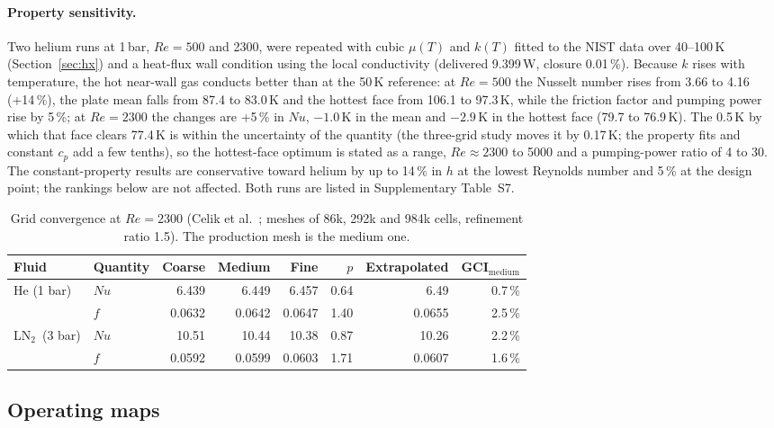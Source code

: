 \documentclass[preprint,12pt]{elsarticle}
\newcommand{\LNtwo}{LN$_2$}
\renewcommand{\Re}{\mathit{Re}}
\newcommand{\Nu}{\mathit{Nu}}
\begin{document}
\paragraph{Property sensitivity.} Two helium runs at 1\,bar, $\Re=500$ and 2300, were repeated
with cubic $\mu(T)$ and $k(T)$ fitted to the NIST data over 40--100\,K (Section~\ref{sec:hx})
and a heat-flux wall condition using the local conductivity (delivered 9.399\,W, closure
0.01\,\%). Because $k$ rises with temperature, the hot near-wall gas conducts better than at
the 50\,K reference: at $\Re=500$ the Nusselt number rises from 3.66 to 4.16 (+14\,\%), the
plate mean falls from 87.4 to 83.0\,K and the hottest face from 106.1 to 97.3\,K, while the
friction factor and pumping power rise by 5\,\%; at $\Re=2300$ the changes are +5\,\% in
$\Nu$, $-1.0$\,K in the mean and $-2.9$\,K in the hottest face (79.7 to 76.9\,K). The 0.5\,K
by which that face clears 77.4\,K is within the uncertainty of the quantity (the three-grid
study moves it by 0.17\,K; the property fits and constant $c_p$ add a few tenths), so the
hottest-face optimum is stated as a range, $\Re\approx2300$ to 5000 and a pumping-power ratio
of 4 to 30. The constant-property results are conservative toward helium by up to 14\,\% in
$h$ at the lowest Reynolds number and 5\,\% at the design point; the rankings below are not
affected. Both runs are listed in Supplementary Table~S7.

\begin{table}[tbp]
\centering\small
\setlength{\tabcolsep}{4pt}\footnotesize
\caption{Grid convergence at $\Re=2300$ (Celik et al.~\cite{45-Celik2008GCI}; meshes of
86k, 292k and 984k cells, refinement ratio 1.5). The production mesh is the medium one.}
\label{tab:gci}
\begin{tabular}{l l r r r r r r}
\toprule
Fluid & Quantity & Coarse & Medium & Fine & $p$ & Extrapolated & GCI$_{\mathrm{medium}}$ \\
\midrule
He (1 bar) & $\Nu$ & 6.439 & 6.449 & 6.457 & 0.64 & 6.49 & 0.7\,\% \\
 & $f$ & 0.0632 & 0.0642 & 0.0647 & 1.40 & 0.0655 & 2.5\,\% \\
\LNtwo\ (3 bar) & $\Nu$ & 10.51 & 10.44 & 10.38 & 0.87 & 10.26 & 2.2\,\% \\
 & $f$ & 0.0592 & 0.0599 & 0.0603 & 1.71 & 0.0607 & 1.6\,\% \\
\bottomrule
\end{tabular}
\end{table}

\subsection{Operating maps}
\label{sec:res-q2-maps}
\end{document}
